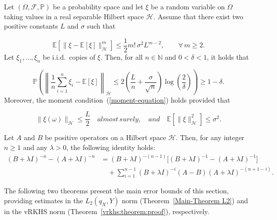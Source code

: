 \documentclass[twoside,11pt]{article}
\begin{document}
\begin{lemma}\label{PINELIS:INEQUALITY} 
Let $(\Omega,\mathcal{F},\mathbb{P})$ be a probability space and let $\xi$ be a random variable on $\Omega$ taking values in a real separable Hilbert space $\mathcal{H}$. 
Assume that there exist two positive constants $L$ and $\sigma$ such that


\begin{equation}\label{moment-equation}
\mathbb{E}\!\left[\big\|\xi-\mathbb{E}[\xi]\big\|_{\mathcal{H}}^{m}\right]
\le \frac{1}{2} m!\,\sigma^{2} L^{m-2},
\qquad \forall\, m \ge 2 .
\end{equation}
Let $\xi_1,\ldots,\xi_n$ be i.i.d.\ copies of $\xi$. Then, for all $n \in \mathbb{N}$ and $0<\delta<1$, it holds that

\[
\mathbb{P}
\left(
\left\|
\frac{1}{n}\sum_{i=1}^{n} \xi_i - \mathbb{E}[\xi]
\right\|_{\mathcal{H}}
\le
2\left(\frac{L}{n} + \frac{\sigma}{\sqrt{n}}\right)
\log \left(\frac{2}{\delta}\right)
\right)
\ge 1-\delta .
\]
Moreover, the moment condition~(\ref{moment-equation}) holds provided that

\[
\|\xi(\omega)\|_{\mathcal{H}} \le \frac{L}{2} \quad {almost \,surely},
\quad {and} \quad
\mathbb{E}\!\left[\|\xi\|_{\mathcal{H}}^{2}\right] \le \sigma^{2}.
\]
\end{lemma}



\begin{lemma}\label{Naveen-acha:lemma}
Let $A$ and $B$ be positive operators on a Hilbert space $\mathcal H$.
Then, for any integer $n \ge 1$ and any $\lambda > 0$, the following identity holds:
\begin{align*}
(B + \lambda I)^{-n} - (A + \lambda I)^{-n}
&= (B + \lambda I)^{-(n-1)}
\bigl[ (B + \lambda I)^{-1}
      - (A + \lambda I)^{-1} \bigr] \\
&\quad + \sum_{i=1}^{n-1}
(B + \lambda I)^{-i}
(A - B)
(A + \lambda I)^{-(n+1-i)} .
\end{align*}
\end{lemma}

\noindent
The following two theorems present the main error bounds of this section, providing estimates in the  \(L_{2}(q_X,{Y})\) norm (Theorem~\ref{Main-Theorem L2}) and in the vRKHS norm (Theorem~\ref{vrkhs:theorem:proof}), respectively.
\end{document}
